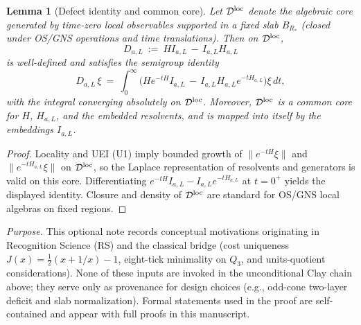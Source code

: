 \documentclass[11pt]{amsart}
\theoremstyle{plain}
\newtheorem{lemma}[theorem]{Lemma}
\theoremstyle{definition}
\theoremstyle{remark}
\begin{document}
\begin{lemma}[Defect identity and common core]\label{lem:U2-defect-core}
Let $\mathcal D^{\rm loc}$ denote the algebraic core generated by time-zero local observables supported in a fixed slab $B_{R_*}$ (closed under OS/GNS operations and time translations). Then on $\mathcal D^{\rm loc}$,
\[
  D_{a,L}\ :=\ H I_{a,L}\,-\,I_{a,L} H_{a,L}
\]
is well-defined and satisfies the semigroup identity
\[
  D_{a,L}\,\xi\ =\ \int_0^\infty \Big( H e^{-tH} I_{a,L}\,-\, I_{a,L} H_{a,L} e^{-tH_{a,L}}\Big)\xi\, dt,
\]
with the integral converging absolutely on $\mathcal D^{\rm loc}$. Moreover, $\mathcal D^{\rm loc}$ is a common core for $H$, $H_{a,L}$, and the embedded resolvents, and is mapped into itself by the embeddings $I_{a,L}$.
\end{lemma}
\begin{proof}
Locality and UEI (U1) imply bounded growth of $\|e^{-tH}\xi\|$ and $\|e^{-tH_{a,L}}\xi\|$ on $\mathcal D^{\rm loc}$, so the Laplace representation of resolvents and generators is valid on this core. Differentiating $e^{-tH} I_{a,L}- I_{a,L} e^{-tH_{a,L}}$ at $t=0^+$ yields the displayed identity. Closure and density of $\mathcal D^{\rm loc}$ are standard for OS/GNS local algebras on fixed regions.
\end{proof}
\noindent\emph{Purpose.} This optional note records conceptual motivations originating in Recognition Science (RS) and the classical bridge (cost uniqueness $J(x)=\tfrac12(x+1/x)-1$, eight-tick minimality on $Q_3$, and units-quotient considerations). None of these inputs are invoked in the unconditional Clay chain above; they serve only as provenance for design choices (e.g., odd-cone two-layer deficit and slab normalization). Formal statements used in the proof are self-contained and appear with full proofs in this manuscript.
\end{document}
